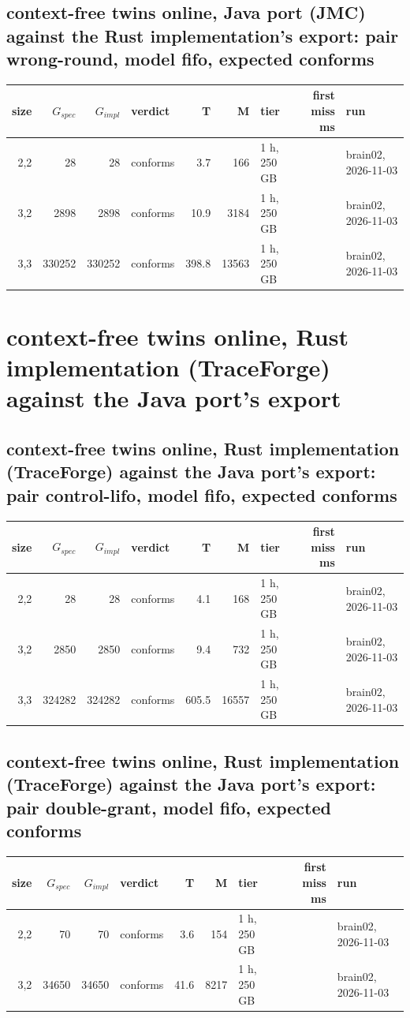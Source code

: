 \documentclass[10pt]{article}
\begin{document}
\subsection*{context-free twins online, Java port (JMC) against the Rust implementation's export: pair \textsf{wrong-round}, model fifo, expected conforms}
\begin{longtable}{@{}rrrlrrlrl@{}}
\toprule
size & $G_{\mathit{spec}}$ & $G_{\mathit{impl}}$ & verdict & T & M & tier & first miss ms & run \\
\midrule
\endhead
\color{red} 2,2 & 28 & 28 & conforms & 3.7 & 166 & 1 h, 250 GB &  & brain02, 2026-11-03 \\
\color{blue} 3,2 & 2898 & 2898 & conforms & 10.9 & 3184 & 1 h, 250 GB &  & brain02, 2026-11-03 \\
\color{blue} 3,3 & 330252 & 330252 & conforms & 398.8 & 13563 & 1 h, 250 GB &  & brain02, 2026-11-03 \\
\bottomrule
\end{longtable}
\section*{context-free twins online, Rust implementation (TraceForge) against the Java port's export}
\subsection*{context-free twins online, Rust implementation (TraceForge) against the Java port's export: pair \textsf{control-lifo}, model fifo, expected conforms}
\begin{longtable}{@{}rrrlrrlrl@{}}
\toprule
size & $G_{\mathit{spec}}$ & $G_{\mathit{impl}}$ & verdict & T & M & tier & first miss ms & run \\
\midrule
\endhead
\color{red} 2,2 & 28 & 28 & conforms & 4.1 & 168 & 1 h, 250 GB &  & brain02, 2026-11-03 \\
\color{red} 3,2 & 2850 & 2850 & conforms & 9.4 & 732 & 1 h, 250 GB &  & brain02, 2026-11-03 \\
\color{red} 3,3 & 324282 & 324282 & conforms & 605.5 & 16557 & 1 h, 250 GB &  & brain02, 2026-11-03 \\
\bottomrule
\end{longtable}
\subsection*{context-free twins online, Rust implementation (TraceForge) against the Java port's export: pair \textsf{double-grant}, model fifo, expected conforms}
\begin{longtable}{@{}rrrlrrlrl@{}}
\toprule
size & $G_{\mathit{spec}}$ & $G_{\mathit{impl}}$ & verdict & T & M & tier & first miss ms & run \\
\midrule
\endhead
\color{red} 2,2 & 70 & 70 & conforms & 3.6 & 154 & 1 h, 250 GB &  & brain02, 2026-11-03 \\
\color{red} 3,2 & 34650 & 34650 & conforms & 41.6 & 8217 & 1 h, 250 GB &  & brain02, 2026-11-03 \\
\bottomrule
\end{longtable}
\end{document}
